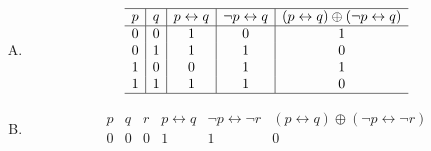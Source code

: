 {{\begin{practices}
\begin{enumerate}[A.]
{\begin{table}[H]
\[\begin{array}{c|c|c|c|c}
                                \hline
                                p & q & p \vee q & p \wedge q & (p \vee q) \oplus (p \wedge q) \\
                                \hline
                                0 & 0 & 0 & 0 & 0 \\
                                0 & 1 & 1 & 0 & 1 \\
                                1 & 0 & 1 & 0 & 1 \\
                                1 & 1 & 1 & 1 & 0 \\
                                \hline
                            \end{array}
                        \]
                    \end{table}
                }
                \item
                {
                    \begin{table}[H]
                        \[
                            \begin{array}{c|c|c|c|c}
                                \hline
                                p & q & p \leftrightarrow q & \neg p \leftrightarrow q & (p \leftrightarrow q) \oplus (\neg p \leftrightarrow q) \\
                                \hline
                                0 & 0 & 1 & 0 & 1 \\
                                0 & 1 & 1 & 1 & 0 \\
                                1 & 0 & 0 & 1 & 1 \\
                                1 & 1 & 1 & 1 & 0 \\
                                \hline
                            \end{array}
                        \]
                    \end{table}
                }
                \item
                {
                    \begin{table}[H]
                        \[
                            \begin{array}{c|c|c|c|c|c}
                                \hline
                                p & q & r & p \leftrightarrow q & \neg p \leftrightarrow \neg r & (p \leftrightarrow q) \oplus (\neg p \leftrightarrow \neg r) \\
                                \hline
                                0 & 0 & 0 & 1 & 1 & 0 \\

\end{array}\]
\end{table}}
\end{enumerate}
\end{practices}}}

